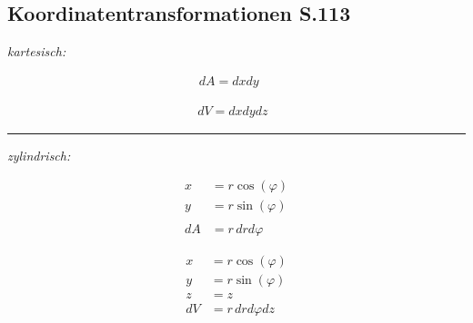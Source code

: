 \subsection{Koordinatentransformationen \texorpdfstring{\hfill S.113}{S.113}}
    \begin{center}
        \textit{kartesisch:}
    \end{center}
    \begin{minipage}{0.49\linewidth}\vspace{-1em}
        \begin{align*}
            dA = dxdy \phantom{ml}
        \end{align*}
    \end{minipage}
    \begin{minipage}{0.49\linewidth}\vspace{-1em}
        \begin{align*}
            dV = dxdydz \phantom{ll}
        \end{align*}
    \end{minipage}

    \hrule
    \begin{center}
        \textit{zylindrisch:}
    \end{center}\vspace{-0.25em}
    \begin{minipage}{0.49\linewidth}\vspace{-1em}
        \begin{align*}
            x &= r \cos(\varphi)\\
            y &= r \sin(\varphi)\\\\[0.25em]
            dA &= r \, drd\varphi
        \end{align*}
    \end{minipage}
    \begin{minipage}{0.49\linewidth}\vspace{-1em}
        \begin{align*}
            x &= r \cos(\varphi)\\
            y &= r \sin(\varphi)\\
            z &= z\\[0.25em]
            dV &= r \, drd\varphi dz
        \end{align*}
    \end{minipage}\vspace{0.5em}

